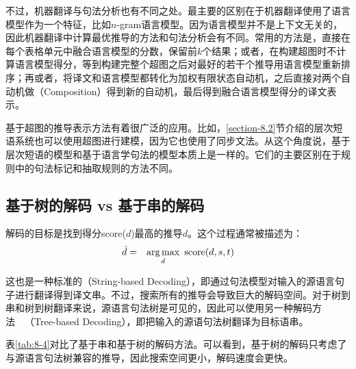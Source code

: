 \parinterval 不过，机器翻译与句法分析也有不同之处。最主要的区别在于机器翻译使用了语言模型作为一个特征，比如$n$-gram语言模型。因为语言模型并不是上下文无关的，因此机器翻译中计算最优推导的方法和句法分析会有不同。常用的方法是，直接在每个表格单元中融合语言模型的分数，保留前$k$个结果；或者，在构建超图时不计算语言模型得分，等到构建完整个超图之后对最好的若干个推导用语言模型重新排序；再或者，将译文和语言模型都转化为加权有限状态自动机，之后直接对两个自动机做{\small{}}（Composition）得到新的自动机，最后得到融合语言模型得分的译文表示。

\parinterval 基于超图的推导表示方法有着很广泛的应用。比如，\ref{section-8.2}节介绍的层次短语系统也可以使用超图进行建模，因为它也使用了同步文法。从这个角度说，基于层次短语的模型和基于语言学句法的模型本质上是一样的。它们的主要区别在于规则中的句法标记和抽取规则的方法不同。


\subsection{基于树的解码 vs 基于串的解码}

\parinterval 解码的目标是找到得分score($d$)最高的推导$d$。这个过程通常被描述为：
\begin{eqnarray}
\hat{d} & = & \operatorname*{arg\,max}_d\ \textrm{score} (d,{s},{t})
\label{eq:8-13}
\end{eqnarray}

\parinterval 这也是一种标准的{\small{}}（String-based Decoding），即通过句法模型对输入的源语言句子进行翻译得到译文串。不过，搜索所有的推导会导致巨大的解码空间。对于树到串和树到树翻译来说，源语言句法树是可见的，因此可以使用另一种解码方法\ \dash \ {\small{}}（Tree-based Decoding），即把输入的源语句法树翻译为目标语串。

\parinterval 表\ref{tab:8-4}对比了基于串和基于树的解码方法。可以看到，基于树的解码只考虑了与源语言句法树兼容的推导，因此搜索空间更小，解码速度会更快。

